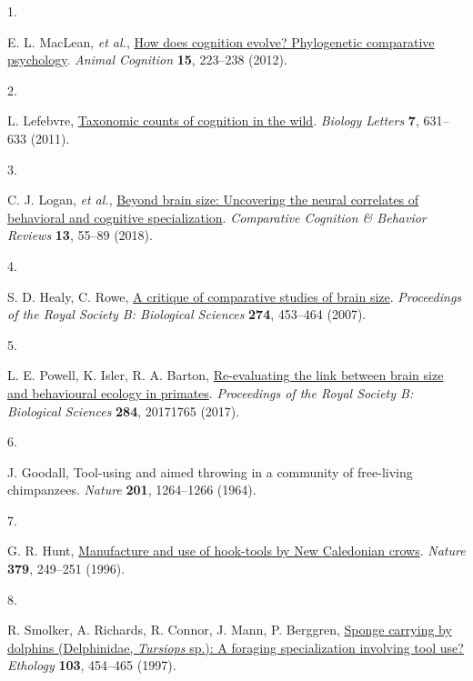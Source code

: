 \documentclass[
  man, donotrepeattitle,floatsintext]{apa6}
\newlength{\cslhangindent}
\newlength{\csllabelwidth}
\newlength{\cslentryspacingunit} %
\newenvironment{CSLReferences}[2] %
 {%
  \setlength{\parindent}{0pt}
  \ifodd #1
  \let\oldpar\par
  \def\par{\hangindent=\cslhangindent\oldpar}
  \fi
  \setlength{\parskip}{#2\cslentryspacingunit}
 }%
 {}
\newcommand{\CSLLeftMargin}[1]{\parbox[t]{\csllabelwidth}{#1}}
\newcommand{\CSLRightInline}[1]{\parbox[t]{\linewidth - \csllabelwidth}{#1}\break}
\begin{document}
\hypertarget{refs}{}
\begin{CSLReferences}{0}{0}
\leavevmode{}%
\CSLLeftMargin{1. }%
\CSLRightInline{E. L. MacLean, \emph{et al.}, \href{https://doi.org/10.1007/s10071-011-0448-8}{How does cognition evolve? Phylogenetic comparative psychology}. \emph{Animal Cognition} \textbf{15}, 223--238 (2012).}

\leavevmode{}%
\CSLLeftMargin{2. }%
\CSLRightInline{L. Lefebvre, \href{https://doi.org/10.1098/rsbl.2010.0556}{Taxonomic counts of cognition in the wild}. \emph{Biology Letters} \textbf{7}, 631--633 (2011).}

\leavevmode{}%
\CSLLeftMargin{3. }%
\CSLRightInline{C. J. Logan, \emph{et al.}, \href{https://doi.org/10.3819/CCBR.2018.130008}{Beyond brain size: Uncovering the neural correlates of behavioral and cognitive specialization}. \emph{Comparative Cognition \& Behavior Reviews} \textbf{13}, 55--89 (2018).}

\leavevmode{}%
\CSLLeftMargin{4. }%
\CSLRightInline{S. D. Healy, C. Rowe, \href{https://doi.org/10.1098/rspb.2006.3748}{A critique of comparative studies of brain size}. \emph{Proceedings of the Royal Society B: Biological Sciences} \textbf{274}, 453--464 (2007).}

\leavevmode{}%
\CSLLeftMargin{5. }%
\CSLRightInline{L. E. Powell, K. Isler, R. A. Barton, \href{https://doi.org/10.1098/rspb.2017.1765}{Re-evaluating the link between brain size and behavioural ecology in primates}. \emph{Proceedings of the Royal Society B: Biological Sciences} \textbf{284}, 20171765 (2017).}

\leavevmode{}%
\CSLLeftMargin{6. }%
\CSLRightInline{J. Goodall, Tool-using and aimed throwing in a community of free-living chimpanzees. \emph{Nature} \textbf{201}, 1264--1266 (1964).}

\leavevmode{}%
\CSLLeftMargin{7. }%
\CSLRightInline{G. R. Hunt, \href{https://doi.org/10.1038/379249a0}{Manufacture and use of hook-tools by {N}ew {C}aledonian crows}. \emph{Nature} \textbf{379}, 249--251 (1996).}

\leavevmode{}%
\CSLLeftMargin{8. }%
\CSLRightInline{R. Smolker, A. Richards, R. Connor, J. Mann, P. Berggren, \href{https://doi.org/10.1111/j.1439-0310.1997.tb00160.x}{Sponge carrying by dolphins ({D}elphinidae, \emph{{T}ursiops} sp.): A foraging specialization involving tool use?} \emph{Ethology} \textbf{103}, 454--465 (1997).}


\end{CSLReferences}
\end{document}
